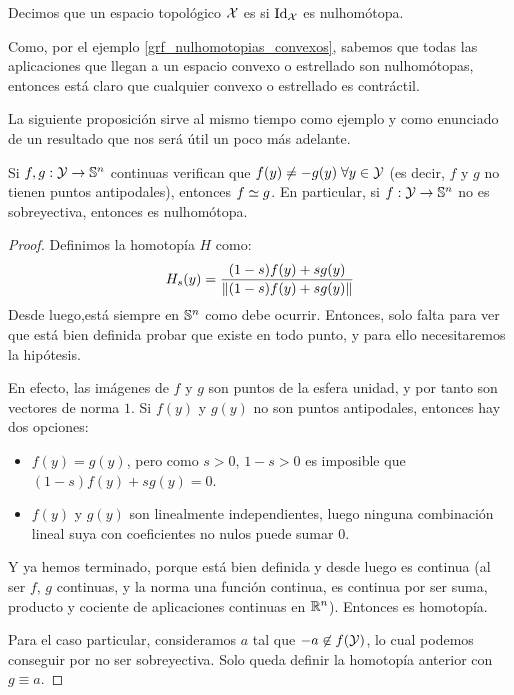 \begin{defi}[Contráctil]
	Decimos que un espacio topológico $\mathcal{X}$ es  si $\operatorname{Id}_{\mathcal{X}}$ es nulhomótopa.
\end{defi}

\begin{obs}
	Como, por el ejemplo \ref{grf_nulhomotopias_convexos}, sabemos que todas las aplicaciones que llegan a un espacio convexo o estrellado son nulhomótopas, entonces está claro que cualquier convexo o estrellado es contráctil.
\end{obs}

La siguiente proposición sirve al mismo tiempo como ejemplo y como enunciado de un resultado que nos será útil un poco más adelante.

\begin{prop}
	\label{grf_prop_esfera_no_sobre_nulhomotopa}
	Si $f,g:\mathcal{Y}\to\mathbb{S}^n$ continuas verifican que $f(y)\neq -g(y)\;\forall y\in\mathcal{Y}$ (es decir, $f$ y $g$ no tienen puntos antipodales), entonces $f\mathrel{\smash{\underset{}{\simeq}}} g$. En particular, si $f:\mathcal{Y}\to\mathbb{S}^n$ no es sobreyectiva, entonces es nulhomótopa.
	
	\begin{proof}
		Definimos la homotopía $H$ como:
		\[H_s(y)=\frac{(1-s)f(y)+sg(y)}{\lVert(1-s)f(y)+sg(y)\rVert}\]
		Desde luego,está siempre en $\mathbb{S}^n$ como debe ocurrir. Entonces, solo falta para ver que está bien definida probar que existe en todo punto, y para ello necesitaremos la hipótesis.
		
		En efecto, las imágenes de $f$ y $g$ son puntos de la esfera unidad, y por tanto son vectores de norma $1$. Si $f(y)$ y $g(y)$ no son puntos antipodales, entonces hay dos opciones:
		\begin{itemize}
			\item $f(y)=g(y)$, pero como $s>0$, $1-s>0$ es imposible que $(1-s)f(y)+sg(y) = 0$.
			\item $f(y)$ y $g(y)$ son linealmente independientes, luego ninguna combinación lineal suya con coeficientes no nulos puede sumar $0$.
		\end{itemize}
	
		Y ya hemos terminado, porque está bien definida y desde luego es continua (al ser $f$, $g$ continuas, y la norma una función continua, es continua por ser suma, producto y cociente de aplicaciones continuas en $\mathbb{R}^n$). Entonces es homotopía.
		
		Para el caso particular, consideramos $a$ tal que $-a\not\in f(\mathcal{Y})$, lo cual podemos conseguir por no ser sobreyectiva. Solo queda definir la homotopía anterior con $g\equiv a$.
	\end{proof}
\end{prop}

